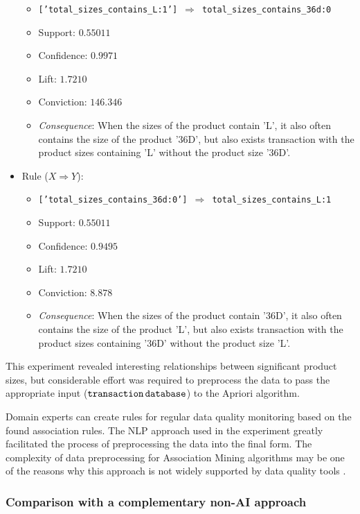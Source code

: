 \begin{itemize}
							\begin{itemize}
								\item \texttt{['total\_sizes\_contains\_L:1'] $\Rightarrow$ total\_sizes\_contains\_36d:0}
								\item Support: $0.55011$
								\item Confidence: $0.9971$
								\item Lift: $1.7210$
								\item Conviction: $146.346$
								\item \emph{Consequence}: \textsf{When the sizes of the product contain 'L', it also often contains the size of the product '36D', but also exists transaction with the product sizes containing 'L' without the product size '36D'.}
							\end{itemize}
						\item Rule ($X \Rightarrow Y$):
							\begin{itemize}
								\item \texttt{['total\_sizes\_contains\_36d:0'] $\Rightarrow$ total\_sizes\_contains\_L:1}
								\item Support: $0.55011$
								\item Confidence: $0.9495$
								\item Lift: $1.7210$
								\item Conviction: $8.878$
								\item \emph{Consequence}: \textsf{When the sizes of the product contain '36D', it also often contains the size of the product 'L', but also exists transaction with the product sizes containing '36D' without the product size 'L'.}
							\end{itemize}
					\end{itemize}									 	
				This experiment revealed interesting relationships between significant product sizes, but considerable effort was required to preprocess the data to pass the appropriate input (${\operatorname{\mathtt{transaction}}}\,{\operatorname{\mathtt{database}}}$) to the Apriori algorithm. 
    			
				Domain experts can create rules for regular data quality monitoring based on the found association rules. The NLP approach used in the experiment greatly facilitated the process of preprocessing the data into the final form. The complexity of data preprocessing for Association Mining algorithms may be one of the reasons why this approach is not widely supported by data quality tools \cite{Ehrlinger2019}.	
						
				\subsubsection{Comparison with a complementary non-AI approach}
				
